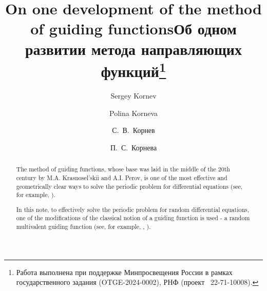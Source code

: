 \begin{englishtitle} %
\title{On one development of the method of guiding functions}
\author{Sergey Kornev \and Polina Korneva  
 }

\maketitle

\begin{abstract}
The method of guiding functions, whose base was laid in the middle of the 20th century by M.A. Krasnosel'skii and A.I. Perov, is one of the most effective and geometrically clear ways to solve the periodic problem for differential equations (see, for example, \cite{k_kr}).

In this note, to effectively solve the periodic problem for random differential equations, one of the modifications of the classical notion of a guiding function is used - a random multivalent guiding function (see, for example, \cite{k_k_o_z_2}, \cite{o_k_k}).

\end{abstract}
\end{englishtitle}

\iffalse
\documentclass[12pt]{llncs}


\usepackage{iftex}

\ifPDFTeX
\usepackage[T2A]{fontenc}
\usepackage[utf8]{inputenc} %
\usepackage[english,russian]{babel}
\fi

\usepackage{todonotes}

\usepackage[russian]{nla}


\fi

%

\title{Об одном развитии метода направляющих функций\thanks{Работа выполнена при поддержке Минпросвещения России в рамках государственного задания (OTGE-2024-0002), РНФ (проект \textnumero~22-71-10008).}}
\author{С.~В.~Корнев  \and П.~С.~Корнева 
 } %


